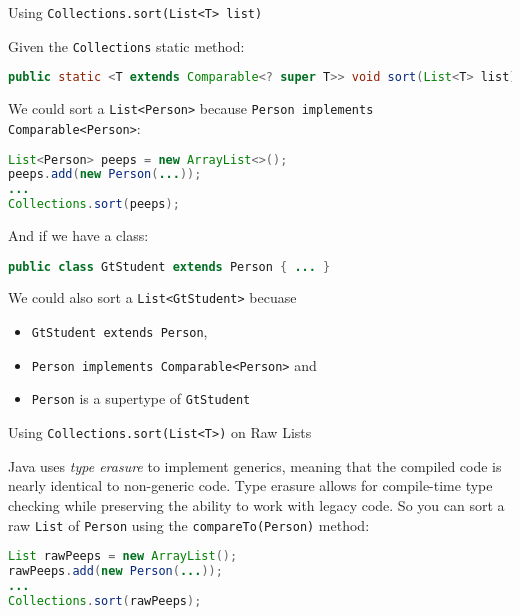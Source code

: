 \documentclass{beamer}
\begin{document}
\begin{frame}[fragile]{Using {\tt Collections.sort(List<T> list)}}


Given the {\tt Collections} static method:
\begin{lstlisting}[language=Java]
public static <T extends Comparable<? super T>> void sort(List<T> list)
\end{lstlisting}

We could sort a {\tt List<Person>} because {\tt Person implements Comparable<Person>}:
\begin{lstlisting}[language=Java]
List<Person> peeps = new ArrayList<>();
peeps.add(new Person(...));
...
Collections.sort(peeps);
\end{lstlisting}
And if we have a class:
\begin{lstlisting}[language=Java]
public class GtStudent extends Person { ... }
\end{lstlisting}

We could also sort a {\tt List<GtStudent>} becuase
\begin{itemize}
\item {\tt GtStudent extends Person},
\item {\tt Person implements Comparable<Person>} and
\item {\tt Person} is a supertype of {\tt GtStudent}
\end{itemize}

\end{frame}

\begin{frame}[fragile]{Using {\tt Collections.sort(List<T>)} on Raw Lists}

Java uses {\it type erasure} to implement generics, meaning that the compiled code is nearly identical to non-generic code.  Type erasure allows for compile-time type checking while preserving the ability to work with legacy code.  So you can sort a raw {\tt List} of {\tt Person} using the {\tt compareTo(Person)} method:

\begin{lstlisting}[language=Java]
List rawPeeps = new ArrayList();
rawPeeps.add(new Person(...));
...
Collections.sort(rawPeeps);
\end{lstlisting}

\end{frame}
\end{document}
